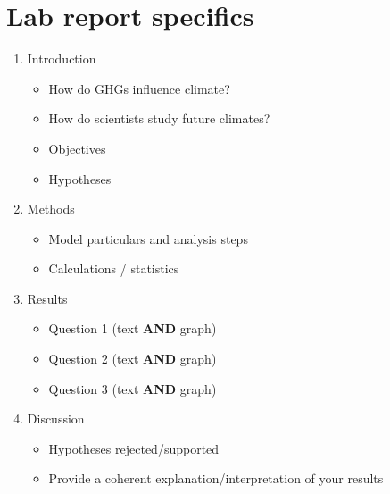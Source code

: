 \documentclass[]{book}
\providecommand{\tightlist}{%
  \setlength{\itemsep}{0pt}\setlength{\parskip}{0pt}}
\begin{document}
\hypertarget{lab-report-specifics-5}{%
\section{Lab report specifics}\label{lab-report-specifics-5}}

\begin{enumerate}
\def\labelenumi{\arabic{enumi}.}
\tightlist
\item
  Introduction

  \begin{itemize}
  \tightlist
  \item
    How do GHGs influence climate?
  \item
    How do scientists study future climates?
  \item
    Objectives
  \item
    Hypotheses
  \end{itemize}
\item
  Methods

  \begin{itemize}
  \tightlist
  \item
    Model particulars and analysis steps
  \item
    Calculations / statistics
  \end{itemize}
\item
  Results

  \begin{itemize}
  \tightlist
  \item
    Question 1 (text \textbf{AND} graph)
  \item
    Question 2 (text \textbf{AND} graph)
  \item
    Question 3 (text \textbf{AND} graph)
  \end{itemize}
\item
  Discussion

  \begin{itemize}
  \tightlist
  \item
    Hypotheses rejected/supported
  \item
    Provide a coherent explanation/interpretation of your results
  \end{itemize}
\end{enumerate}



\backmatter
\printindex
\end{document}
